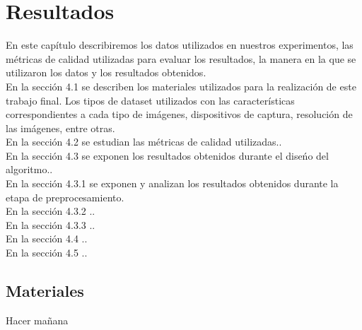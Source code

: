 
\chapter{Resultados} %

En este cap\'itulo  describiremos los datos utilizados en 	nuestros experimentos, las m\'etricas de calidad utilizadas para evaluar los resultados, la manera en la que se  utilizaron los datos y los resultados obtenidos.\\

En la secci\'on  4.1 se describen los materiales utilizados para la realizaci\'on de este trabajo final. Los tipos de dataset utilizados con las caracter\'isticas correspondientes a cada tipo de im\'agenes, dispositivos de captura, resoluci\'on de las im\'agenes, entre otras.\\

En la secci\'on 4.2  se estudian las m\'etricas de calidad utilizadas..\\

En la secci\'on 4.3 se exponen los resultados obtenidos durante el dise\'no del algoritmo..\\

En la secci\'on 4.3.1 se exponen y analizan los resultados obtenidos durante la etapa de preprocesamiento. \\

En la secci\'on 4.3.2 ..\\

En la secci\'on 4.3.3 ..\\

En la secci\'on 4.4 ..\\

En la secci\'on 4.5 ..\\



\label{Chapter4} %


\section{Materiales}

Hacer mañana
